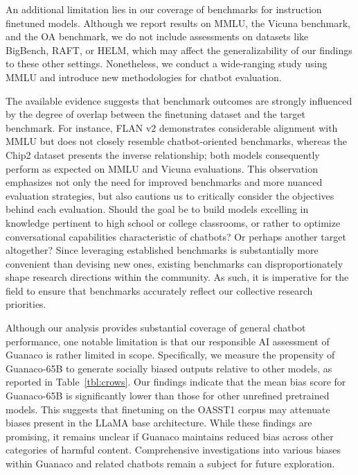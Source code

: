 An additional limitation lies in our coverage of benchmarks for instruction finetuned models. Although we report results on MMLU, the Vicuna benchmark, and the OA benchmark, we do not include assessments on datasets like BigBench, RAFT, or HELM, which may affect the generalizability of our findings to these other settings. Nonetheless, we conduct a wide-ranging study using MMLU and introduce new methodologies for chatbot evaluation.

The available evidence suggests that benchmark outcomes are strongly influenced by the degree of overlap between the finetuning dataset and the target benchmark. For instance, FLAN v2 demonstrates considerable alignment with MMLU but does not closely resemble chatbot-oriented benchmarks, whereas the Chip2 dataset presents the inverse relationship; both models consequently perform as expected on MMLU and Vicuna evaluations. This observation emphasizes not only the need for improved benchmarks and more nuanced evaluation strategies, but also cautions us to critically consider the objectives behind each evaluation. Should the goal be to build models excelling in knowledge pertinent to high school or college classrooms, or rather to optimize conversational capabilities characteristic of chatbots? Or perhaps another target altogether? Since leveraging established benchmarks is substantially more convenient than devising new ones, existing benchmarks can disproportionately shape research directions within the community. As such, it is imperative for the field to ensure that benchmarks accurately reflect our collective research priorities.

Although our analysis provides substantial coverage of general chatbot performance, one notable limitation is that our responsible AI assessment of {Guanaco} is rather limited in scope. Specifically, we measure the propensity of {Guanaco}-65B to generate socially biased outputs relative to other models, as reported in Table~\ref{tbl:crows}. Our findings indicate that the mean bias score for {Guanaco}-65B is significantly lower than those for other unrefined pretrained models. This suggests that finetuning on the OASST1 corpus may attenuate biases present in the LLaMA base architecture. While these findings are promising, it remains unclear if {Guanaco} maintains reduced bias across other categories of harmful content. Comprehensive investigations into various biases within {Guanaco} and related chatbots remain a subject for future exploration.

